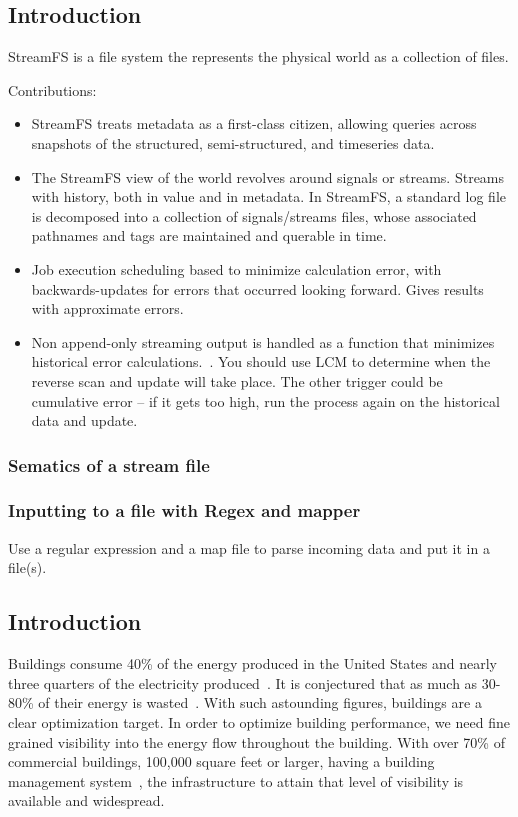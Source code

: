 \subsection{Introduction}
StreamFS is a file system the represents the physical world as a collection of files.  

Contributions:
\begin{itemize}
\item StreamFS treats metadata as a first-class citizen, allowing queries across snapshots of the structured, semi-structured,
and timeseries data.

\item The StreamFS view of the world revolves around signals or streams.  Streams with history, both in value and in metadata.  
In StreamFS, a standard log file is decomposed into a collection of signals/streams files, whose associated pathnames and tags
are maintained and querable in time.

\item Job execution scheduling based to minimize calculation error, with backwards-updates for errors that occurred looking forward.
		Gives results with approximate errors.

\item Non append-only streaming output is handled as a function that minimizes historical error calculations.~\cite{syncsql}.
		You should use LCM to determine when the reverse scan and update will take place.  The other trigger could be 
		cumulative error -- if it gets too high, run the process again on the historical data and update.


\end{itemize}


\subsubsection{Sematics of a stream file}

\subsubsection{Inputting to a file with Regex and mapper}
Use a regular expression and a map file to parse incoming data and put it in a file(s).

\subsection{Introduction}%
Buildings consume 40\% of the energy produced in the United States and nearly three quarters of 
the electricity produced~\cite{epabuildings}.  It is conjectured that as much as 30-80\% of their energy is 
wasted~\cite{waste_science, next10_waste}.  With such astounding figures, buildings are a clear optimization
target.  In order to optimize building performance, we need fine grained visibility into the energy flow
throughout the building.  With over 70\% of commercial buildings, 100,000 square feet or 
larger, having a building management system~\cite{cbecs2003}, the infrastructure to attain that level of 
visibility is available and widespread.  

